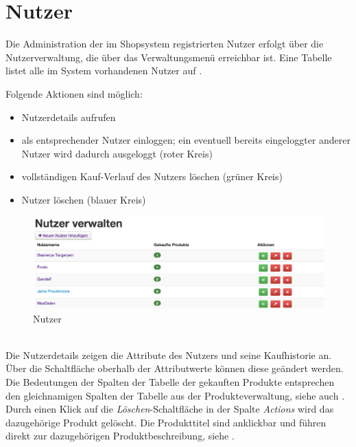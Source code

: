 \section{Nutzer}
\label{chp:Nutzer}
Die Administration der im Shopsystem registrierten Nutzer erfolgt über die Nutzerverwaltung, die über das Verwaltungsmenü erreichbar ist. Eine Tabelle listet alle im System vorhandenen Nutzer auf .

Folgende Aktionen sind möglich:
\begin{itemize}
  \item Nutzerdetails aufrufen 
  \vspace*{-0.5em}
  \item als entsprechender Nutzer einloggen; ein eventuell bereits eingeloggter anderer Nutzer wird dadurch ausgeloggt (roter Kreis)
  \vspace*{-0.5em}
  \item vollständigen Kauf-Verlauf des Nutzers löschen (grüner Kreis)
  \vspace*{-0.5em}
  \item Nutzer löschen (blauer Kreis)
\end{itemize}

\begin{figure}[h!]
  \centering
  \includegraphics[width=\textwidth]{img/Nutzer.png}
  \caption{Nutzer}
  \label{fig:Nutzer}
\end{figure}
\text{}\vspace*{-1em}\\
Die Nutzerdetails  zeigen die Attribute des Nutzers und seine Kaufhistorie an. Über die Schaltfläche oberhalb der Attributwerte können diese ge\-än\-dert werden. Die Bedeutungen der Spalten der Tabelle der gekauften Produkte entsprechen den gleichnamigen Spalten der Tabelle aus der Produkteverwaltung, siehe auch . Durch einen Klick auf die \textit{Löschen}-Schaltfläche in der Spalte \textit{Actions} wird das dazugehörige Produkt gelöscht. Die Produkttitel sind anklickbar und führen direkt zur dazugehörigen Produktbeschreibung, siehe .

